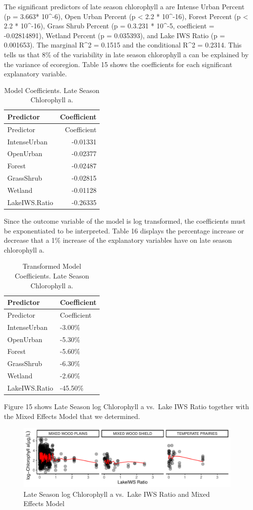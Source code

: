 \documentclass[12pt,]{article}
\begin{document}
The significant predictors of late season chlorophyll a are Intense
Urban Percent (p = 3.663* 10\^{}-6), Open Urban Percent (p \textless{}
2.2 * 10\^{}-16), Forest Percent (p \textless{} 2.2 * 10\^{}-16), Grass
Shrub Percent (p = 0.3.231 * 10\^{}-5, coefficient = -0.02814891),
Wetland Percent (p = 0.035393), and Lake IWS Ratio (p = 0.001653). The
marginal R\^{}2 = 0.1515 and the conditional R\^{}2 = 0.2314. This tells
us that 8\% of the variability in late season chlorophyll a can be
explained by the variance of ecoregion. Table 15 shows the coefficients
for each significant explanatory variable.

\begin{longtable}[]{@{}lr@{}}
\caption{Model Coefficients. Late Season Chlorophyll a.}\tabularnewline
\toprule
Predictor & Coefficient\tabularnewline
\midrule
\endfirsthead
\toprule
Predictor & Coefficient\tabularnewline
\midrule
\endhead
IntenseUrban & -0.01331\tabularnewline
OpenUrban & -0.02377\tabularnewline
Forest & -0.02487\tabularnewline
GrassShrub & -0.02815\tabularnewline
Wetland & -0.01128\tabularnewline
LakeIWS.Ratio & -0.26335\tabularnewline
\bottomrule
\end{longtable}

Since the outcome variable of the model is log transformed, the
coefficients must be exponentiated to be interpreted. Table 16 displays
the percentage increase or decrease that a 1\% increase of the
explanatory variables have on late season chlorophyll a.

\newpage

\begin{longtable}[]{@{}ll@{}}
\caption{Transformed Model Coefficients. Late Season Chlorophyll
a.}\tabularnewline
\toprule
Predictor & Coefficient\tabularnewline
\midrule
\endfirsthead
\toprule
Predictor & Coefficient\tabularnewline
\midrule
\endhead
IntenseUrban & -3.00\%\tabularnewline
OpenUrban & -5.30\%\tabularnewline
Forest & -5.60\%\tabularnewline
GrassShrub & -6.30\%\tabularnewline
Wetland & -2.60\%\tabularnewline
LakeIWS.Ratio & -45.50\%\tabularnewline
\bottomrule
\end{longtable}

Figure 15 shows Late Season log Chlorophyll a vs.~Lake IWS Ratio
together with the Mixed Effects Model that we determined.

\begin{figure}
\centering
\includegraphics{Bollt_Greif_Raby_Roth_Project_Final_files/figure-latex/unnamed-chunk-32-1.pdf}
\caption{Late Season log Chlorophyll a vs.~Lake IWS Ratio and Mixed
Effects Model}
\end{figure}
\end{document}
